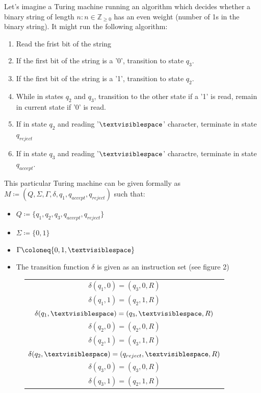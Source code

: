 \documentclass{article}
\begin{document}
\begin{exmp}
Let's imagine a Turing machine running an algorithm which decides whether a binary string of length $n : n \in \mathbb{Z}_{\geq 0}$ has an even weight (number of 1s in the binary string).  It might run the following algorithm:
\begin{enumerate}
	\item Read the frist bit of the string
	\item If the first bit of the string is a '0', transition to state $q_{3}$.
	\item If the first bit of the string is a '1', transition to state $q_{2}$.
	\item While in states $q_{2}$ and $q_{3}$, transition to the other state if a '1' is read, remain in current state if '0' is read.
	\item If in state $q_{2}$ and reading '$\textvisiblespace$' character, terminate in state $q_{reject}$
	\item If in state $q_{3}$ and reading '$\textvisiblespace$' charactre, terminate in state $q_{accept}$.
\end{enumerate}
\noindent This particular Turing machine can be given formally as $M \coloneq (Q, \Sigma, \Gamma, \delta, q_{1}, q_{accept}, q_{reject})$ such that:
\begin{itemize}
	\item $Q \coloneq \{ q_{1}, q_{2}, q_{3}, q_{accept}, q_{reject} \}$
	\item $\Sigma \coloneq \{ 0, 1 \}$
	\item $\Gamma \coloneq \{ 0, 1, \textvisiblespace \}$
	\item The transition function $\delta$ is given as an instruction set (see figure 2)
\end{itemize}
\begin{figure}[h]
	\begin{tabular}{ c }
	$\delta(q_{1}, 0) = (q_{3}, 0, R)$ \\
	$\delta(q_{1}, 1) = (q_{2}, 1, R)$ \\
	$\delta(q_{1}, \textvisiblespace) = (q_{3}, \textvisiblespace, R)$ \\
	$\delta(q_{2}, 0) = (q_{2}, 0, R)$ \\
	$\delta(q_{2}, 1) = (q_{3}, 1, R)$ \\
	$\delta(q_{2}, \textvisiblespace) = (q_{reject}, \textvisiblespace, R)$ \\
	$\delta(q_{3}, 0) = (q_{3}, 0, R)$ \\
	$\delta(q_{3}, 1) = (q_{2}, 1, R)$ \\

\end{tabular}
\end{figure}
\end{exmp}
\end{document}

